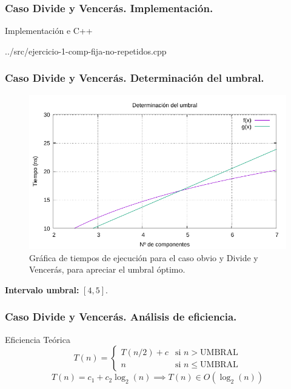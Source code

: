 \documentclass[13pt]{beamer}
\begin{document}
	\begin{frame}
		\frametitle{Caso Divide y Vencerás. Implementación.}
		\begin{exampleblock}{Implementación e C++}
			
			{../src/ejercicio-1-comp-fija-no-repetidos.cpp} 
		\end{exampleblock}
	\end{frame}

	\begin{frame}
		\frametitle{Caso Divide y Vencerás. Determinación del umbral.}
		\begin{figure}
			\centering
			\includegraphics[scale=0.76]{img/e1a-umbral.pdf}
			\caption{Gráfica de tiempos de ejecución para el caso obvio y Divide y Vencerás, para apreciar el umbral
				óptimo.}
			\label{fig:1a-com-graph}
		\end{figure}

        \textbf{Intervalo umbral: } $[4,5]$. 
	\end{frame}

	\begin{frame}
	\frametitle{Caso Divide y Vencerás. Análisis de eficiencia.}
		\begin{block}{Eficiencia Teórica}
			\begin{equation}
			T(n) = \left\{ \begin{array}{lr} T(n/2) + c & \text{si } n > \text{UMBRAL}\\ n & \text{si } n \leqslant \text{UMBRAL} \end{array} \right.
			\label{eq:1a-efi-dyv-rec}
			\end{equation}
			\begin{equation}
			T(n) = c_{1} + c_{2} \log_2(n) \implies \boxed{T(n) \in O(\log_2(n))}
			\label{eq:1a-eficiencia-lineal}
			\end{equation}
		\end{block}
	\end{frame}
\end{document}
